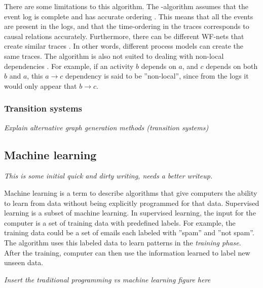 \documentclass[english,12pt,a4paper,pdftex,sci,utf8]{aaltothesis}
\theoremstyle{definition}
\newcommand{\nyi}[1]{\noindent\colorbox{nyibg}{\textcolor{nyitext}{\emph{#1}}}}
\begin{document}
There are some limitations to this algorithm.
The \textalpha-algorithm assumes that the event log is complete and has accurate ordering \cite{van2013discovering}. This means that all the events are present in the logs, and that the time-ordering in the traces corresponds to causal relations accurately. Furthermore, there can be different WF-nets that create similar traces \cite{van2013discovering}. In other words, different process models can create the same traces.
The algorithm is also not suited to dealing with non-local dependencies \cite{van2013discovering}.
For example, if an activity $b$ depends on $a$, and $c$ depends on both $b$ and $a$, this $a \rightarrow c$ dependency is said to be ''non-local'', since from the logs it would only appear that $b \rightarrow c$. 

\subsubsection{Transition systems}

\nyi{Explain alternative graph generation methods (transition systems) \cite{van2013discovering}}



\subsection{Machine learning}

\nyi{This is some initial quick and dirty writing, needs a better writeup.}

Machine learning is a term to describe algorithms that give computers the ability to learn from data without being explicitly programmed for that data. Supervised learning is a subset of machine learning. In supervised learning, the input for the computer is a set of training data with predefined labels. For example, the training data could be a set of emails each labeled with ''spam'' and ''not spam''. The algorithm uses this labeled data to learn patterns in the \emph{training phase}. After the training, computer can then use the information learned to label new unseen data.

\nyi{Insert the traditional programming vs machine learning figure here}
\end{document}
